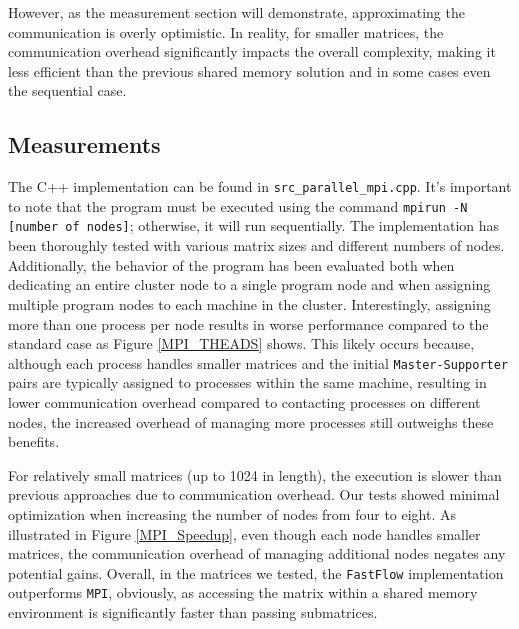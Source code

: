 However, as the measurement section will demonstrate, approximating the communication is overly optimistic. In reality, for smaller matrices, the communication overhead significantly impacts the overall complexity, making it less efficient than the previous shared memory solution and in some cases even the sequential case.

\subsection*{Measurements}
The C++ implementation can be found in \texttt{src\_parallel\_mpi.cpp}. It's important to note that the program must be executed using the command \texttt{mpirun -N [number of nodes]}; otherwise, it will run sequentially. The implementation has been thoroughly tested with various matrix sizes and different numbers of nodes. Additionally, the behavior of the program has been evaluated both when dedicating an entire cluster node to a single program node and when assigning multiple program nodes to each machine in the cluster. Interestingly, assigning more than one process per node results in worse performance compared to the standard case as Figure \ref{MPI_THEADS} shows. This likely occurs because, although each process handles smaller matrices and the initial \texttt{Master-Supporter} pairs are typically assigned to processes within the same machine, resulting in lower communication overhead compared to contacting processes on different nodes, the increased overhead of managing more processes still outweighs these benefits.

\par For relatively small matrices (up to 1024 in length), the execution is slower than previous approaches due to communication overhead. Our tests showed minimal optimization when increasing the number of nodes from four to eight. As illustrated in Figure \ref{MPI_Speedup}, even though each node handles smaller matrices, the communication overhead of managing additional nodes negates any potential gains. Overall, in the matrices we tested, the \texttt{FastFlow} implementation outperforms \texttt{MPI}, obviously, as accessing the matrix within a shared memory environment is significantly faster than passing submatrices.

